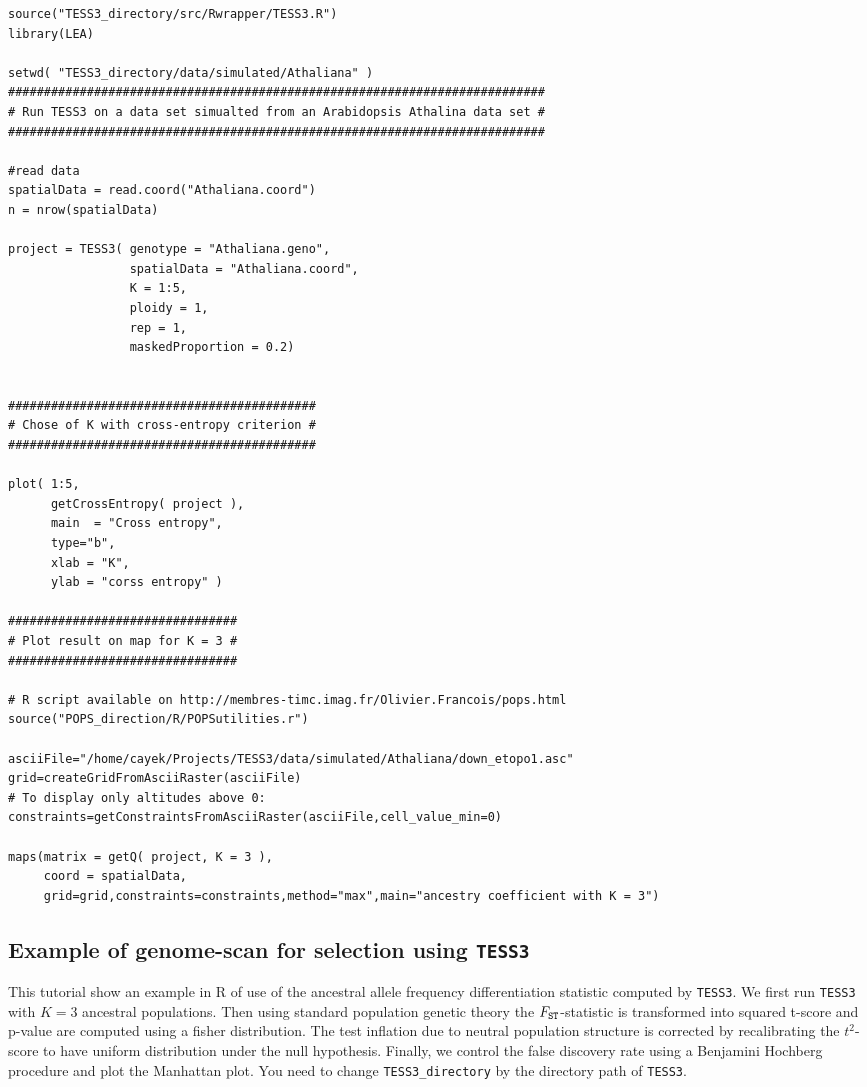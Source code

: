\documentclass[10pt,a4paper]{article}
\begin{document}
\begin{Verbatim}[frame=single]
source("TESS3_directory/src/Rwrapper/TESS3.R")
library(LEA)

setwd( "TESS3_directory/data/simulated/Athaliana" )
###########################################################################
# Run TESS3 on a data set simualted from an Arabidopsis Athalina data set #
###########################################################################

#read data
spatialData = read.coord("Athaliana.coord")
n = nrow(spatialData)

project = TESS3( genotype = "Athaliana.geno", 
                 spatialData = "Athaliana.coord", 
                 K = 1:5, 
                 ploidy = 1, 
                 rep = 1, 
                 maskedProportion = 0.2)


###########################################
# Chose of K with cross-entropy criterion #
###########################################

plot( 1:5, 
      getCrossEntropy( project ), 
      main  = "Cross entropy",
      type="b", 
      xlab = "K", 
      ylab = "corss entropy" )

################################
# Plot result on map for K = 3 #
################################

# R script available on http://membres-timc.imag.fr/Olivier.Francois/pops.html
source("POPS_direction/R/POPSutilities.r")

asciiFile="/home/cayek/Projects/TESS3/data/simulated/Athaliana/down_etopo1.asc"
grid=createGridFromAsciiRaster(asciiFile)
# To display only altitudes above 0:
constraints=getConstraintsFromAsciiRaster(asciiFile,cell_value_min=0)

maps(matrix = getQ( project, K = 3 ),
     coord = spatialData,
     grid=grid,constraints=constraints,method="max",main="ancestry coefficient with K = 3")

\end{Verbatim}



\subsection{Example of genome-scan for selection using {\tt TESS3}}
This tutorial show an example in R of use of the ancestral allele frequency differentiation statistic computed by {\tt TESS3}. We first run {\tt TESS3} with $K = 3$ ancestral populations. Then using standard population genetic theory the $F_{\tt ST}$-statistic is transformed into squared t-score and p-value are computed using a fisher distribution. The test inflation due to neutral population structure is corrected by recalibrating the $t^2$-score to have uniform distribution under the null hypothesis. Finally, we control the false discovery rate using a Benjamini Hochberg procedure and plot the Manhattan plot. You need to change \verb|TESS3_directory| by the directory path of {\tt TESS3}.
\end{document}
